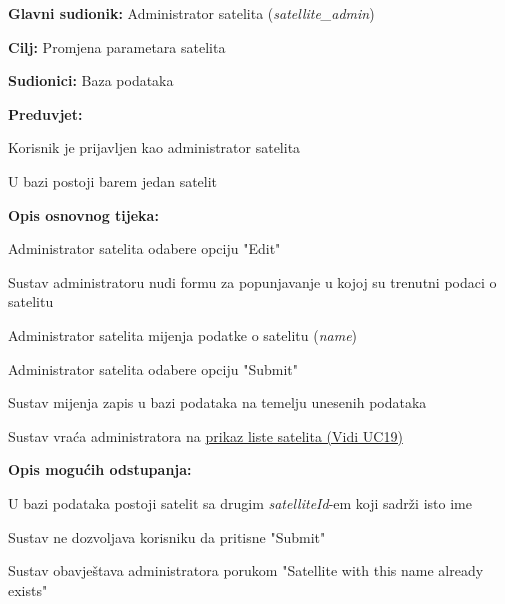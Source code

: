 				\noindent {}
			\begin{packed_item}
				
				\item \textbf{Glavni sudionik: }Administrator satelita (\textit{satellite\_admin})
				\item  \textbf{Cilj: }Promjena parametara satelita
				\item  \textbf{Sudionici: }Baza podataka
				\item  \textbf{Preduvjet: }
				\begin{packed_enum}
					\item Korisnik je prijavljen kao administrator satelita
				\item U bazi postoji barem jedan satelit	\end{packed_enum}
				\item  \textbf{Opis osnovnog tijeka: }
				
				\item[] \begin{packed_enum}
					\item Administrator satelita odabere opciju "Edit"
					\item Sustav administratoru nudi formu za popunjavanje u kojoj su trenutni podaci o satelitu
					\item Administrator satelita mijenja podatke o satelitu (\textit{name})
					\item Administrator satelita odabere opciju "Submit"
					\item Sustav mijenja zapis u bazi podataka na temelju unesenih podataka
					\item Sustav vraća administratora na \hyperref[UC19]{prikaz liste satelita (Vidi UC19)} 
					
				\end{packed_enum}
				
				\item  \textbf{Opis mogućih odstupanja: }
				
				\item[] \begin{packed_enum}
					
					\item[1] U bazi podataka postoji satelit sa drugim \textit{satelliteId}-em koji sadrži isto ime
					\item[ ] \begin{packed_enum}
						
						\item[1.1] Sustav ne dozvoljava korisniku da pritisne "Submit"
						\item[1.2] Sustav obavještava administratora porukom "Satellite with this name already exists"
					\end{packed_enum}
				\end{packed_enum}
			\end{packed_item}
		

